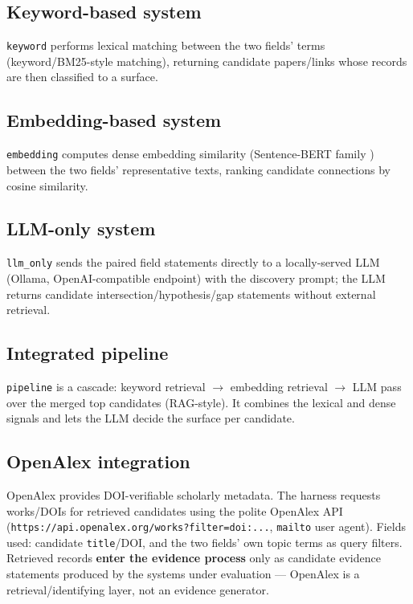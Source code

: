 \documentclass[11pt]{article}
\begin{document}
\subsection{Keyword-based system}
\label{sec:keyword}
\texttt{keyword} performs lexical matching between the two fields' terms
(keyword/BM25-style matching), returning candidate papers/links whose records are
then classified to a surface.

\subsection{Embedding-based system}
\label{sec:embedding}
\texttt{embedding} computes dense embedding similarity (Sentence-BERT family
\citep{reimers2019sentencebert, sbert}) between the two fields' representative
texts, ranking candidate connections by cosine similarity.

\subsection{LLM-only system}
\label{sec:llmonly}
\texttt{llm\_only} sends the paired field statements directly to a
locally-served LLM (Ollama, OpenAI-compatible endpoint) with the discovery
prompt; the LLM returns candidate intersection/hypothesis/gap statements without
external retrieval.

\subsection{Integrated pipeline}
\label{sec:pipeline}
\texttt{pipeline} is a cascade: keyword retrieval $\rightarrow$ embedding
retrieval $\rightarrow$ LLM pass over the merged top candidates (RAG-style). It
combines the lexical and dense signals and lets the LLM decide the surface per
candidate.

\subsection{OpenAlex integration}
\label{sec:openalex}
OpenAlex provides DOI-verifiable scholarly metadata. The harness requests
works/DOIs for retrieved candidates using the polite OpenAlex API
(\texttt{https://api.openalex.org/works?filter=doi:...}, \texttt{mailto} user
agent). Fields used: candidate \texttt{title}/DOI, and the two fields' own topic
terms as query filters. Retrieved records \textbf{enter the evidence process} only
as candidate evidence statements produced by the systems under evaluation ---
OpenAlex is a retrieval/identifying layer, not an evidence generator.
\end{document}
